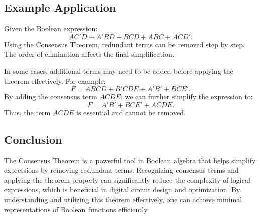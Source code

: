\subsection{Example Application}
Given the Boolean expression:
\[
AC'D + A'BD + BCD + ABC + ACD'.
\]
Using the Consensus Theorem, redundant terms can be removed step by step. The order of elimination affects the final simplification.

In some cases, additional terms may need to be added before applying the theorem effectively. For example:
\[
F = ABCD + B'CDE + A'B' + BCE'.
\]
By adding the consensus term \( ACDE \), we can further simplify the expression to:
\[
F = A'B' + BCE' + ACDE.
\]
Thus, the term \( ACDE \) is essential and cannot be removed.

\subsection{Conclusion}
The Consensus Theorem is a powerful tool in Boolean algebra that helps simplify expressions by removing redundant terms. Recognizing consensus terms and applying the theorem properly can significantly reduce the complexity of logical expressions, which is beneficial in digital circuit design and optimization. By understanding and utilizing this theorem effectively, one can achieve minimal representations of Boolean functions efficiently.
